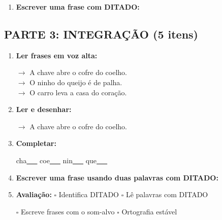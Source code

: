\begin{exercicio}
\begin{enumerate}[resume]
  \item \textbf{Escrever uma frase com DITADO:}
  \begin{center}
  \underline{\hspace{12cm}}
  \end{center}

\end{enumerate}

\subsection*{PARTE 3: INTEGRAÇÃO (5 itens)}

\begin{enumerate}[resume]

  \item \textbf{Ler frases em voz alta:}
  \begin{center}
  $\rightarrow$ A chave abre o cofre do coelho.\\
  $\rightarrow$ O ninho do queijo é de palha.\\
  $\rightarrow$ O carro leva a casa do coração.\\
  \end{center}

  \item \textbf{Ler e desenhar:}
  \begin{center}
  $\rightarrow$ A chave abre o cofre do coelho.
  \end{center}
  \begin{center}
  \end{center}

  \item \textbf{Completar:}
  \begin{center}
  cha\underline{~~~} \quad coe\underline{~~~} \quad nin\underline{~~~} \quad que\underline{~~~}
  \end{center}

  \item \textbf{Escrever uma frase usando duas palavras com DITADO:}
  \begin{center}
  \underline{\hspace{12cm}}
  \end{center}

  \item \textbf{Avaliação:} $\square$ Identifica DITADO \quad $\square$ Lê palavras com DITADO
  \begin{center}
  $\square$ Escreve frases com o som-alvo \quad $\square$ Ortografia estável
  \end{center}


\end{enumerate}
\end{exercicio}
